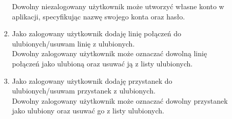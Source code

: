 \documentclass[10pt,a4paper]{article}
\begin{document}
\begin{enumerate}
\begin{enumerate}[label*=\arabic*.]
\begin{enumerate}[label*=\arabic*.]
			    Dowolny niezalogowany użytkownik może utworzyć własne konto w aplikacji, specyfikując nazwę swojego konta oraz hasło.
		 	\item Jako zalogowany użytkownik dodaję linię połączeń do ulubionych/usuwam linię z ulubionych. \\
			    Dowolny zalogowany użytkownik może oznaczać dowolną linię połączeń jako ulubioną oraz usuwać ją z listy ulubionych.
		 	\item Jako zalogowany użytkownik dodaję przystanek do ulubionych/usuwam przystanek z ulubionych. \\
			    Dowolny zalogowany użytkownik może oznaczać dowolny przystanek jako ulubiony oraz usuwać go z listy ulubionych.
		\end{enumerate}
	\end{enumerate}
\end{enumerate}
\end{document}
